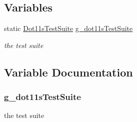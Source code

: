 \subsection*{Variables}
\begin{DoxyCompactItemize}
\item 
static \hyperlink{classDot11sTestSuite}{Dot11s\+Test\+Suite} \hyperlink{dot11s-test-suite_8cc_abeee5c9ffa164e558d5742ddbc26b577}{g\+\_\+dot11s\+Test\+Suite}
\begin{DoxyCompactList}\small\item\em the test suite \end{DoxyCompactList}\end{DoxyCompactItemize}


\subsection{Variable Documentation}
\subsubsection[{\texorpdfstring{g\+\_\+dot11s\+Test\+Suite}{g_dot11sTestSuite}}]{ g\+\_\+dot11s\+Test\+Suite\hspace{0.3cm}{\ttfamily [static]}}\hypertarget{dot11s-test-suite_8cc_abeee5c9ffa164e558d5742ddbc26b577}{}\label{dot11s-test-suite_8cc_abeee5c9ffa164e558d5742ddbc26b577}


the test suite 

